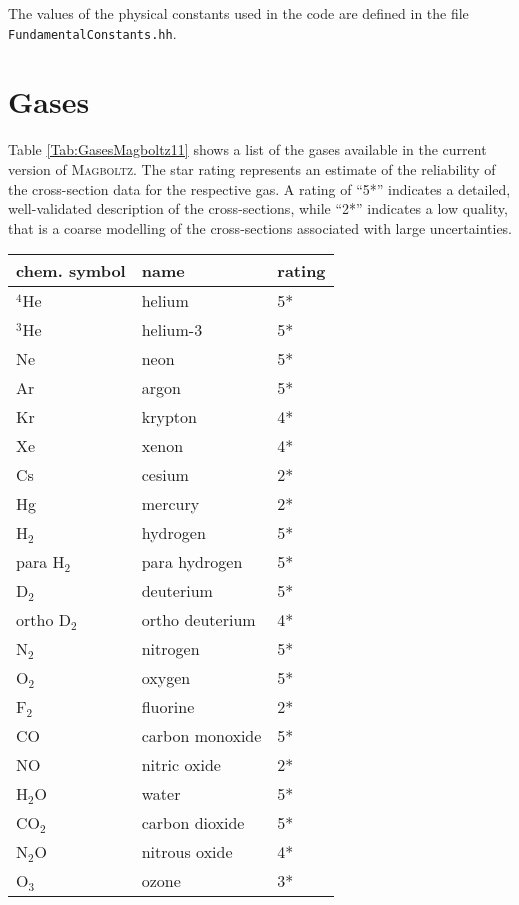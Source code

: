 \begin{appendix}
The values of the physical constants used in the code are defined  
in the file \texttt{FundamentalConstants.hh}.

\chapter{Gases}

Table \ref{Tab:GasesMagboltz11} shows a list of the gases 
available in the current version of \textsc{Magboltz}. 
The star rating represents an estimate of the reliability 
of the cross-section data for the respective gas. 
A rating of ``5*'' indicates a detailed, well-validated 
description of the cross-sections, while 
``2*'' indicates a low quality, that is 
a coarse modelling of the cross-sections 
associated with large uncertainties.

\begin{longtable}{l l l}
  \toprule
   chem. symbol & name & rating \\
  \midrule
  \(^{4}\)He & helium   & 5* \\
  \(^{3}\)He & helium-3 & 5* \\
          Ne & neon     & 5* \\
          Ar & argon    & 5* \\
          Kr & krypton  & 4* \\
          Xe & xenon    & 4* \\
  \midrule
  Cs         & cesium   & 2* \\
  Hg         & mercury  & 2* \\
  \midrule
  H\(_{2}\) & hydrogen  & 5* \\
  para H\(_{2}\) & para hydrogen  & 5* \\
  D\(_{2}\) & deuterium & 5* \\
  ortho D\(_{2}\) & ortho deuterium & 4* \\
  N\(_{2}\) & nitrogen  & 5* \\
  O\(_{2}\) & oxygen    & 5* \\
  F\(_{2}\) & fluorine  & 2* \\
  \midrule
  CO         & carbon monoxide & 5* \\
  NO         & nitric oxide    & 2* \\
  \midrule
  H\(_{2}\)O & water           & 5* \\ 
  CO\(_{2}\) & carbon dioxide  & 5* \\
  N\(_{2}\)O & nitrous oxide   & 4* \\
  O\(_{3}\)  & ozone           & 3* \\

\end{longtable}
\end{appendix}
